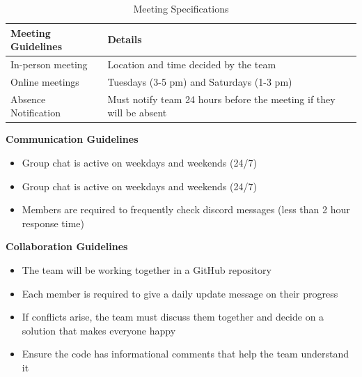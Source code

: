\documentclass{article} %
\begin{document}
\begin{table}[H]
\caption{Meeting Specifications}
\begin{center}
\begin{tabular}{|l|l|}
\hline
\textbf{Meeting Guidelines} & \textbf{Details} \\ \hline
In-person meeting           & Location and time decided by the team \\ \hline
Online meetings             & Tuesdays (3-5 pm) and Saturdays (1-3 pm) \\ \hline
Absence Notification        & Must notify team 24 hours before the meeting if they will be absent \\ \hline
\end{tabular}
\end{center}
\end{table}

\textbf{Communication Guidelines}
\begin{itemize}
  \item Group chat is active on weekdays and weekends (24/7)
  \item Group chat is active on weekdays and weekends (24/7)
  \item Members are required to frequently check discord messages (less than 2 hour response time)
\end{itemize}

\textbf{Collaboration Guidelines}
\begin{itemize}
  \item The team will be working together in a GitHub repository
  \item Each member is required to give a daily update message on their progress
  \item If conflicts arise, the team must discuss them together and decide on a solution that makes everyone happy
  \item Ensure the code has informational comments that help the team understand it
\end{itemize}
\end{document}
